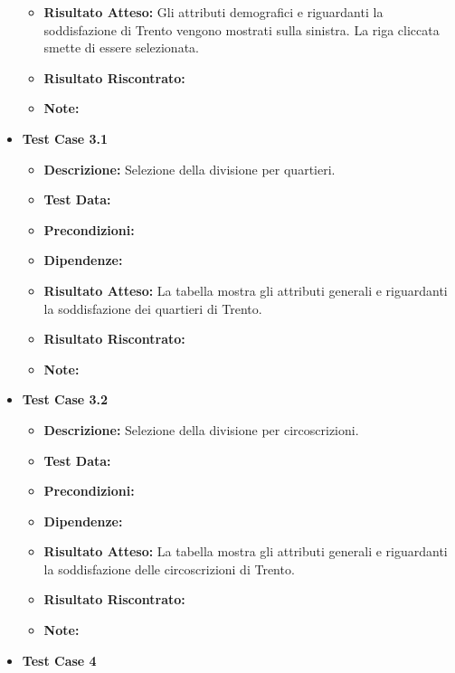 \begin{itemize}
\begin{itemize}
                    \item \textbf{Risultato Atteso:} Gli attributi demografici e riguardanti la soddisfazione di Trento vengono mostrati sulla sinistra. La riga cliccata smette di essere selezionata.
                    \item \textbf{Risultato Riscontrato:}
                    \item \textbf{Note:}
                \end{itemize}  
            \item \textbf{Test Case 3.1}
                \begin{itemize}
                    \item \textbf{Descrizione:} Selezione della divisione per quartieri.
                    \item \textbf{Test Data:}
                    \item \textbf{Precondizioni:}
                    \item \textbf{Dipendenze:}
                    \item \textbf{Risultato Atteso:} La tabella mostra gli attributi generali e riguardanti la soddisfazione dei quartieri di Trento.
                    \item \textbf{Risultato Riscontrato:}
                    \item \textbf{Note:}
                \end{itemize}
            \item \textbf{Test Case 3.2}
                \begin{itemize}
                    \item \textbf{Descrizione:} Selezione della divisione per circoscrizioni.
                    \item \textbf{Test Data:}
                    \item \textbf{Precondizioni:}
                    \item \textbf{Dipendenze:}
                    \item \textbf{Risultato Atteso:} La tabella mostra gli attributi generali e riguardanti la soddisfazione delle circoscrizioni di Trento.
                    \item \textbf{Risultato Riscontrato:}
                    \item \textbf{Note:}
                \end{itemize}
            \item \textbf{Test Case 4}
                \begin{itemize}

\end{itemize}
\end{itemize}
